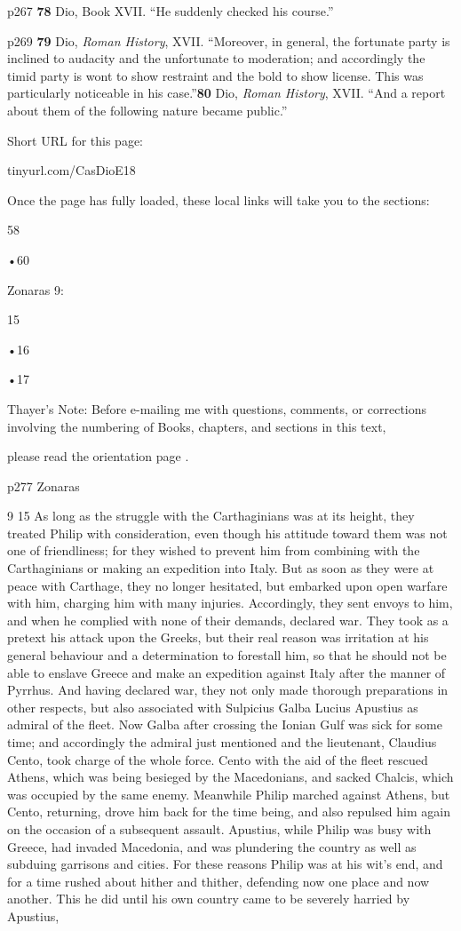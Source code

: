 p267
\textbf{78}
Dio, Book XVII. ``He suddenly checked his course.''

p269
\textbf{79}
Dio, \emph{Roman History}, XVII. ``Moreover, in general, the fortunate party is inclined to audacity and the unfortunate to moderation; and accordingly the timid party is wont to show restraint and the bold to show license. This was particularly noticeable in his case.''\texthebrew{⁠}\textbf{80}
Dio, \emph{Roman History}, XVII. ``And a report about them of the following nature became public.''\texthebrew{⁠}

Short URL for this page:

tinyurl.com/CasDioE18

Once the page has fully loaded, these local links will take you to the sections:

58

\texthebrew{•}60

Zonaras 9:

15

\texthebrew{•}16

\texthebrew{•}17

Thayer's Note: Before e-mailing me with questions, comments, or corrections involving the numbering of Books, chapters, and sections in this text,

please read the orientation page .

p277
Zonaras

9
15
As long as the struggle with the Carthaginians was at its height, they treated Philip with consideration, even though his attitude toward them was not one of friendliness; for they wished to prevent him from combining with the Carthaginians or making an expedition into Italy. But as soon as they were at peace with Carthage, they no longer hesitated, but embarked upon open warfare with him, charging him with many injuries. Accordingly, they sent envoys to him, and when he complied with none of their demands, declared war. They took as a pretext his attack upon the Greeks, but their real reason was irritation at his general behaviour and a determination to forestall him, so that he should not be able to enslave Greece and make an expedition against Italy after the manner of Pyrrhus. And having declared war, they not only made thorough preparations in other respects, but also associated with Sulpicius Galba Lucius Apustius as admiral of the fleet. Now Galba after crossing the Ionian Gulf was sick for some time; and accordingly the admiral just mentioned and the lieutenant, Claudius Cento, took charge of the whole force. Cento with the aid of the fleet rescued Athens, which was being besieged by the Macedonians, and sacked Chalcis, which was occupied by the same enemy. Meanwhile Philip marched against Athens, but Cento, returning, drove him back for the time being, and also repulsed him again on the occasion of a subsequent assault. Apustius, while Philip was busy with Greece, had invaded Macedonia, and was plundering the country as well as subduing garrisons and cities. For these reasons Philip was at his wit's end, and for a time rushed about hither and thither, defending now one place and now another. This he did until his own country came to be severely harried by Apustius,

